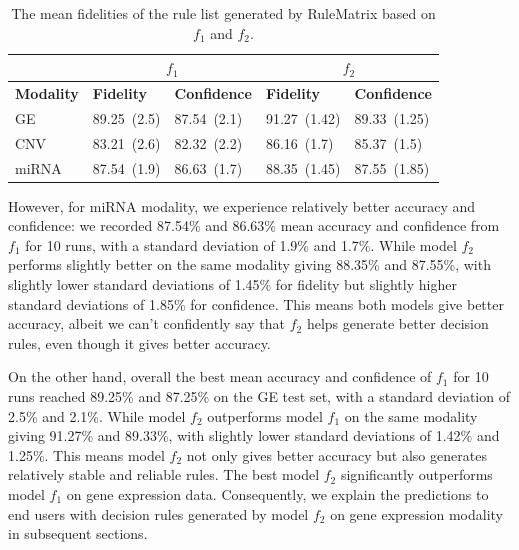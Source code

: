\begin{table}[h!]
    \centering
    \caption{The mean fidelities of the rule list generated by RuleMatrix based on $f_1$ and $f_2$.}
    \label{table:rules_overall_result}
    \vspace{-2mm}
    \scriptsize{
    \begin{tabular}{l|l|l|l|l} 
        \hline
         & \multicolumn{2}{c|}{$f_1$} & \multicolumn{2}{c}{$f_2$} \\ 
        \hline
        \textbf{Modality} & \textbf{Fidelity} & \textbf{Confidence} & \textbf{Fidelity} & \textbf{Confidence} \\ 
        \hline
        GE  & 89.25~(2.5) & 87.54~(2.1) & 91.27~(1.42) & 89.33~(1.25) \\ 
        \cline{1-3}\cline{4-5}
        CNV & 83.21~(2.6) & 82.32~(2.2) & 86.16~(1.7) & 85.37~(1.5) \\ 
        \hline
        miRNA & 87.54~(1.9) & 86.63~(1.7) & 88.35~(1.45) & 87.55~(1.85) \\
        \hline
    \end{tabular}}
    \vspace{-4mm}
\end{table}

However, for miRNA modality, we experience relatively better accuracy and confidence: we recorded 87.54\% and 86.63\% mean accuracy and confidence from $f_1$ for 10 runs, with a standard deviation of 1.9\% and 1.7\%. While model $f_2$ performs slightly better on the same modality giving 88.35\% and 87.55\%, with slightly lower standard deviations of 1.45\% for fidelity but slightly higher standard deviations of 1.85\% for confidence. This means both models give better accuracy, albeit we can't confidently say that $f_2$ helps generate better decision rules, even though it gives better accuracy. 

\hspace*{3.5mm} On the other hand, overall the best mean accuracy and confidence of $f_1$ for 10 runs reached 89.25\% and 87.25\% on the GE test set, with a standard deviation of 2.5\% and 2.1\%. While model $f_2$ outperforms model $f_1$ on the same modality giving 91.27\% and 89.33\%, with slightly lower standard deviations of 1.42\% and 1.25\%. This means model $f_2$ not only gives better accuracy but also generates relatively stable and reliable rules. The best model $f_2$ significantly outperforms model $f_1$ on gene expression data. Consequently, we explain the predictions to end users with decision rules generated by model $f_2$ on gene expression modality in subsequent sections. 


